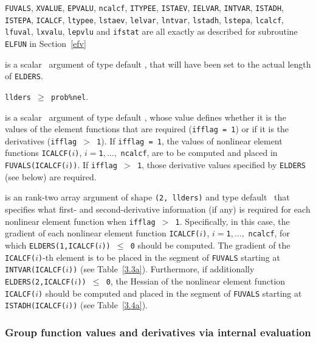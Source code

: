 \documentclass{galahad}
\begin{document}
\begin{description}

{\tt FUVALS}, {\tt XVALUE}, {\tt EPVALU}, {\tt ncalcf}, {\tt ITYPEE},
{\tt ISTAEV}, {\tt IELVAR},
{\tt INTVAR}, {\tt ISTADH}, {\tt ISTEPA}, {\tt ICALCF}, {\tt ltypee},
{\tt lstaev}, {\tt lelvar},
{\tt lntvar}, {\tt lstadh}, {\tt lstepa}, {\tt lcalcf}, {\tt lfuval},
{\tt lxvalu}, {\tt lepvlu} and
{\tt ifstat} are all exactly as described for subroutine {\tt ELFUN}
in Section~\ref{efv}

 is a scalar \intentin\ argument of type default \integer, that
will have been set to the actual length of {\tt ELDERS}.

\restriction
{\tt llders $\geq$ prob\%nel}.

 is a scalar \intentin\ argument of type default \integer,
whose value defines whether it is the values of the element functions
that are required ({\tt ifflag = 1}) or if it is the derivatives
({\tt ifflag $>$ 1}). If
{\tt ifflag = 1}, the values of nonlinear element functions
{\tt ICALCF($i$)}, $i = ${\tt 1}$, \ldots ,$ {\tt ncalcf}, are to be computed
and placed in {\tt FUVALS(ICALCF($i$))}. If {\tt ifflag $>$ 1}, those
derivative values specified by {\tt ELDERS} (see below) are required.


is an rank-two \intentinout array argument of
shape {\tt (2, llders)} and type default \integer\,
that specifies what first- and second-derivative information (if any) is
required for each nonlinear element function when {\tt ifflag $>$ 1}.
Specifically, in this case, the gradient of each nonlinear element function
{\tt ICALCF($i$)}, $i = ${\tt 1}$, \ldots ,$ {\tt ncalcf},
for which {\tt ELDERS(1,ICALCF($i$)) $\leq$ 0} should be computed.
The gradient of the {\tt ICALCF($i$)}-th element is to be placed in
the segment of {\tt FUVALS} starting at {\tt INTVAR(ICALCF($i$))}
(see Table~\ref{3.3a}). Furthermore, if additionally
{\tt ELDERS(2,ICALCF($i$)) $\leq$ 0}, the Hessian of the
nonlinear element function {\tt ICALCF($i$)} should be computed and placed in
the segment of {\tt FUVALS} starting at {\tt ISTADH(ICALCF($i$))}
(see Table~\ref{3.4a}).

\end{description}


\subsubsection{Group function values and derivatives via internal
evaluation\label{gfv}}
\end{document}
